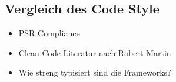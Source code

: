 \subsection{Vergleich des Code Style}
\color{red}
\begin{itemize}
    \item PSR Compliance
    \item Clean Code Literatur nach Robert Martin
    \item Wie streng typisiert sind die Frameworks?
\end{itemize}
\color{black}
